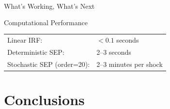 \documentclass[aspectratio=169,12pt]{beamer}
\begin{document}
\begin{frame}{What's Working, What's Next}
\vspace{0.1cm}
\begin{block}{Computational Performance}
   \footnotesize
\begin{tabular}{ll}
Linear IRF: & $<0.1$ seconds \\
Deterministic SEP: & 2--3 seconds \\
Stochastic SEP (order=20): & 2--3 minutes per shock
\end{tabular}
\end{block}

\end{frame}

\section{Conclusions}
\end{document}
